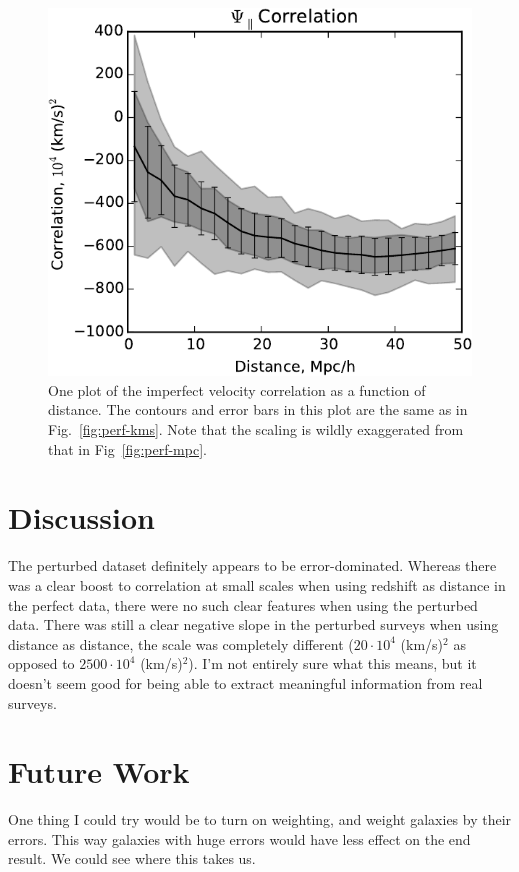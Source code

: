 \documentclass[usenatbib]{mn2e}
\begin{document}
\begin{figure}
  \begin{center}
  \includegraphics[scale=0.75]{psipar-pert-0,2-comp1-mpc.pdf}
  \end{center}
\caption{\small
One plot of the imperfect velocity correlation as a function of distance. The contours and error bars in this plot are the same as in Fig.~\ref{fig:perf-kms}. Note that the scaling is wildly exaggerated from that in Fig~\ref{fig:perf-mpc}.
}
\label{fig:pert-mpc}
\end{figure}

\section{Discussion}
The perturbed dataset definitely appears to be error-dominated. Whereas there was a clear boost to correlation at small scales when using redshift as distance in the perfect data, there were no such clear features when using the perturbed data. There was still a clear negative slope in the perturbed surveys when using distance as distance, the scale was completely different ($20 \cdot 10^4$ (km/s)$^2$  as opposed to $2500 \cdot 10^4$ (km/s)$^2$). I'm not entirely sure what this means, but it doesn't seem good for being able to extract meaningful information from real surveys. 

\section{Future Work}
One thing I could try would be to turn on weighting, and weight galaxies by their errors. This way galaxies with huge errors would have less effect on the end result. We could see where this takes us.



\end{document}
